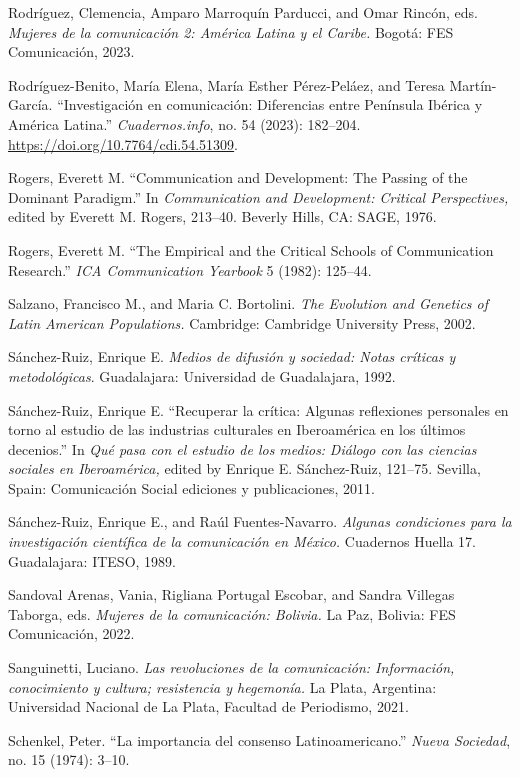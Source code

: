 \documentclass{tufte-handout}
\begin{document}
\begin{hangparas}{.25in}{1}
Rodríguez, Clemencia, Amparo Marroquín Parducci, and Omar Rincón, eds.
\emph{Mujeres de la comunicación 2: América Latina y el Caribe.} Bogotá:
FES Comunicación, 2023.

Rodríguez-Benito, María Elena, María Esther Pérez-Peláez, and Teresa
Martín-García. ``Investigación en comunicación: Diferencias entre
Península Ibérica y América Latina.'' \emph{Cuadernos.info}, no. 54
(2023): 182--204. \url{https://doi.org/10.7764/cdi.54.51309}.

Rogers, Everett M. ``Communication and Development: The Passing of the
Dominant Paradigm.'' In \emph{Communication and Development: Critical
Perspectives,} edited by Everett M. Rogers, 213--40. Beverly Hills, CA:
SAGE, 1976.

Rogers, Everett M. ``The Empirical and the Critical Schools of
Communication Research.'' \emph{ICA Communication Yearbook} 5 (1982):
125--44.

Salzano, Francisco M., and Maria C. Bortolini. \emph{The Evolution and
Genetics of Latin American Populations.} Cambridge: Cambridge University
Press, 2002.

Sánchez-Ruiz, Enrique E. \emph{Medios de difusión y sociedad: Notas
críticas y metodológicas}. Guadalajara: Universidad de Guadalajara,
1992.

Sánchez-Ruiz, Enrique E. ``Recuperar la crítica: Algunas reflexiones
personales en torno al estudio de las industrias culturales en
Iberoamérica en los últimos decenios.'' In \emph{Qué pasa con el estudio
de los medios:} \emph{Diálogo con las ciencias sociales en
Iberoamérica,} edited by Enrique E. Sánchez-Ruiz, 121--75. Sevilla, Spain:
Comunicación Social ediciones y publicaciones, 2011.

Sánchez-Ruiz, Enrique E., and Raúl Fuentes-Navarro. \emph{Algunas
condiciones para la investigación científica de la comunicación en
México.} Cuadernos Huella 17. Guadalajara: ITESO, 1989.

Sandoval Arenas, Vania, Rigliana Portugal Escobar, and Sandra Villegas
Taborga, eds. \emph{Mujeres de la comunicación: Bolivia.} La Paz,
Bolivia: FES Comunicación, 2022.

Sanguinetti, Luciano. \emph{Las revoluciones de la comunicación:
Información, conocimiento y cultura; resistencia y hegemonía.} La Plata,
Argentina: Universidad Nacional de La Plata, Facultad de Periodismo,
2021.

Schenkel, Peter. ``La importancia del consenso Latinoamericano.''
\emph{Nueva Sociedad}, no. 15 (1974): 3--10.


\end{hangparas}
\end{document}
